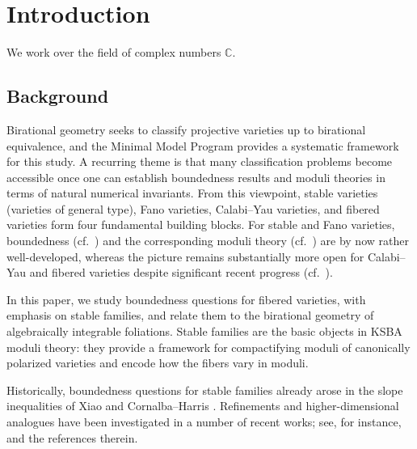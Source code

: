 \documentclass[11pt,reqno]{amsart}
\numberwithin{equation}{section}
\theoremstyle{definition}
\begin{document}
\address{Department of Mathematics, King’s College London, Strand, London WC2R 2LS, UK}

\address{Dipartimento di Matematica ``F. Enriques'', Universit\`a degli Studi di Milano, Via Saldini 50, 20133 Milano (MI), Italy}


\maketitle

\tableofcontents

\section{Introduction}\label{sec: introduction}

We work over the field of complex numbers $\mathbb C$.

\subsection*{Background}
Birational geometry seeks to classify projective varieties up to birational equivalence, and the Minimal Model Program provides a systematic framework for this study. 
A recurring theme is that many classification problems become accessible once one can establish boundedness results and moduli theories in terms of natural numerical invariants. 
From this viewpoint, stable varieties (varieties of general type), Fano varieties, Calabi--Yau varieties, and fibered varieties form four fundamental building blocks. 
For stable and Fano varieties, boundedness (cf.~\cite{HMX18,Bir21a}) and the corresponding moduli theory (cf.~\cite{Kol23,Xu25a}) are by now rather well-developed, whereas the picture remains substantially more open for Calabi--Yau and fibered varieties despite significant recent progress (cf.~\cite{Bir23b,BFMT25,Eng+25,FHS25}). 

In this paper, we study boundedness questions for fibered varieties, with emphasis on stable families, and relate them to the birational geometry of algebraically integrable foliations. Stable families are the basic objects in KSBA moduli theory: they provide a framework for compactifying moduli of canonically polarized varieties and encode how the fibers vary in moduli.

Historically, boundedness questions for stable families already arose in the slope inequalities of Xiao and Cornalba--Harris \cite{Xia87,CH88}. Refinements and higher-dimensional analogues have been investigated in a number of recent works; see, for instance, \cite{CTV23,CPT25} and the references therein. 
\end{document}
